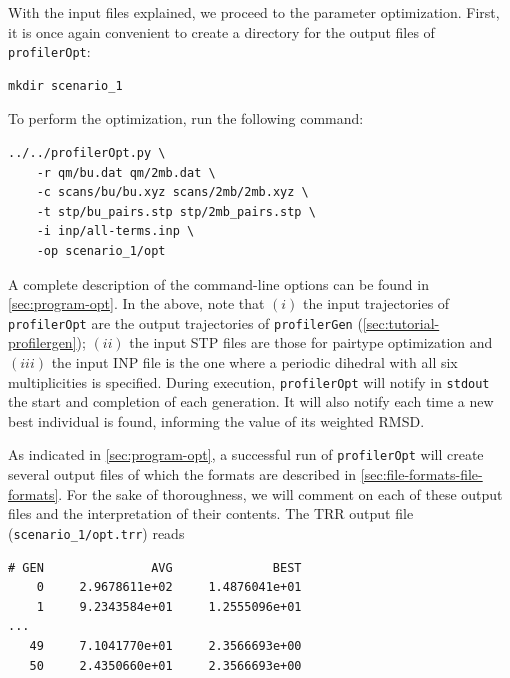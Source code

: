 \documentclass[10pt,a4paper]{report}
\numberwithin{equation}{section}
\newcommand{\under}{\_}
\newcommand{\profileropt}[0]{\texttt{profilerOpt}}
\newcommand{\profilergen}[0]{\texttt{profilerGen}}
\begin{document}
With the input files explained, we proceed to the parameter
optimization.
%
First, it is once again convenient to create a directory for the
output files of \profileropt{}:

\begin{lstlisting}
mkdir scenario_1
\end{lstlisting}\vspace{-2ex}\par

\noindent To perform the optimization, run the following command:

\begin{lstlisting}
../../profilerOpt.py \
    -r qm/bu.dat qm/2mb.dat \
    -c scans/bu/bu.xyz scans/2mb/2mb.xyz \
    -t stp/bu_pairs.stp stp/2mb_pairs.stp \
    -i inp/all-terms.inp \
    -op scenario_1/opt
\end{lstlisting}\vspace{-2ex}\par

\noindent A complete description of the command-line options can be
found in \autoref{sec:program-opt}.
%
In the above, note that $(i)$ the input trajectories of \profileropt{}
are the output trajectories of \profilergen{}
(\autoref{sec:tutorial-profilergen});
%
$(ii)$ the input STP files are those for pairtype optimization
%
and $(iii)$ the input INP file is the one where a periodic dihedral
with all six multiplicities is specified.
%
During execution, \profileropt{} will notify in \texttt{stdout} the
start and completion of each generation.
%
It will also notify each time a new best individual is found,
informing the value of its weighted RMSD.
%

As indicated in \autoref{sec:program-opt}, a successful run of
\profileropt{} will create several output files of which the formats
are described in \autoref{sec:file-formats-file-formats}.
%
For the sake of thoroughness, we will comment on each of these output
files and the interpretation of their contents.
%
The TRR output file (\texttt{scenario\under{}1/opt.trr}) reads

\begin{lstlisting}
# GEN               AVG              BEST
    0     2.9678611e+02     1.4876041e+01
    1     9.2343584e+01     1.2555096e+01
...
   49     7.1041770e+01     2.3566693e+00
   50     2.4350660e+01     2.3566693e+00
\end{lstlisting}\vspace{-2ex}\par
\end{document}
